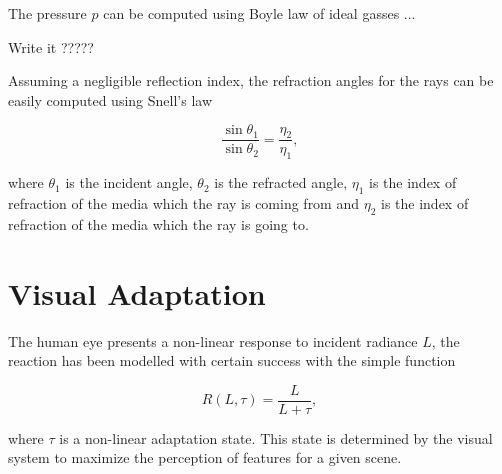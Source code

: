 The pressure $p$ can be computed using Boyle law of ideal gasses ...

Write it ?????

Assuming a negligible reflection index, the refraction angles for the rays can be easily computed using Snell's law

\begin{equation}
\frac{\sin \theta_1}{\sin \theta_2} = \frac{\eta_2}{\eta_1},
\end{equation}

where $\theta_1$ is the incident angle, $\theta_2$ is the refracted angle, $\eta_1$ is the index of refraction of the media which the ray is coming from and $\eta_2$ is the index of refraction of the media which the ray is going to.

\section{Visual Adaptation}
\label{sec:visual_adaptation}

The human eye presents a non-linear response to incident radiance $L$, the reaction has been modelled  with certain success with the simple function 

\begin{equation}
R(L, \tau) = \frac{L}{L + \tau},
\end{equation}

where $\tau$ is a non-linear adaptation state.
This state is determined by the visual system to maximize the perception of features for a given scene.
